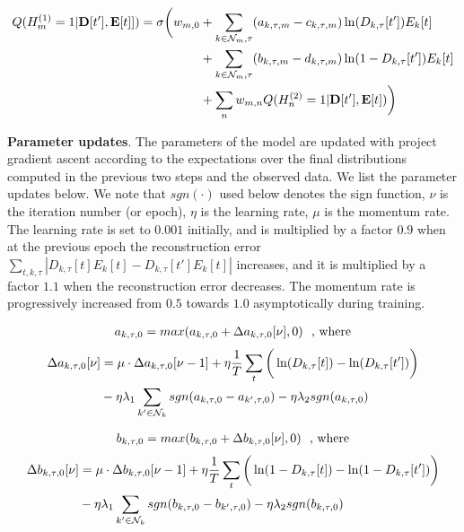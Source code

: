 \begin{align*}
Q( H_m^{(1)} = 1 | \mathbf{D}[t'], \mathbf{E}[t]] ) =
\sigma \bigg( w_{m, 0} & + \sum\limits_{k \in \mathcal{N}_m,\tau} (  a_{k,\tau,m} - c_{k,\tau,m} ) \ln(D_{k,\tau}[t']) E_k[t] \\
& + \sum\limits_{k \in \mathcal{N}_m,\tau} (  b_{k,\tau,m} - d_{k,\tau,m} ) \ln(1 - D_{k,\tau}[t']) E_k[t] \\
& + \sum\limits_{n} w_{m, n} Q( H_n^{(2)} = 1 | \mathbf{D}[t'], \mathbf{E}[t] ) \bigg)
\end{align*}


\textbf{Parameter updates}. The parameters of the model are updated with project gradient ascent according to the expectations over the final distributions computed in the previous two steps and the observed data. We list the parameter updates below. We note that $sgn(\cdot)$ used below denotes the sign function, $\nu$ is the iteration number (or epoch), $\eta$ is the learning rate, $\mu$ is the momentum rate. The learning rate is set to $0.001$ initially, and is multiplied by a factor $0.9$ when at the previous epoch the reconstruction error $\sum_{t,k,\tau} |D_{k,\tau}[t] E_k[t] -  D_{k,\tau}[t'] E_k[t] |$ increases, and it is multiplied by a factor $1.1$ when the reconstruction error decreases. The momentum rate is progressively increased from $0.5$ towards $1.0$ asymptotically during training.

\begin{align*}
a_{k,\tau,0} = max( a_{k,\tau,0} + \Delta a_{k,\tau,0}[\nu], 0 ) \textrm{\,\,\,\,, where}
\end{align*}
\begin{align*}
\Delta a_{k,\tau,0}[\nu] & = \mu \cdot \Delta a_{k,\tau,0}[\nu-1] + \eta \frac{1}{T}\sum\limits_t \bigg( \ln(D_{k,\tau}[t]) - \ln(D_{k,\tau}[t']) \bigg) \\
& - \eta \lambda_1 \sum\limits_{k' \in \mathcal{N}_k} sgn( a_{k,\tau,0} - a_{k',\tau,0} ) - \eta \lambda_2 sgn( a_{k,\tau,0} ) \\
\end{align*}

\begin{align*}
b_{k,\tau,0} = max( b_{k,\tau,0} + \Delta b_{k,\tau,0}[\nu], 0 ) \textrm{\,\,\,\,, where} \\
\end{align*}
\begin{align*}
\Delta b_{k,\tau,0}[\nu] & = \mu \cdot \Delta b_{k,\tau,0}[\nu-1] + \eta \frac{1}{T}\sum\limits_t  \bigg( \ln(1-D_{k,\tau}[t]) - \ln(1-D_{k,\tau}[t']) \bigg) \\
& - \eta \lambda_1 \sum\limits_{k' \in \mathcal{N}_k} sgn( b_{k,\tau,0} - b_{k',\tau,0} ) - \eta \lambda_2 sgn( b_{k,\tau,0} )  \\
\end{align*}

